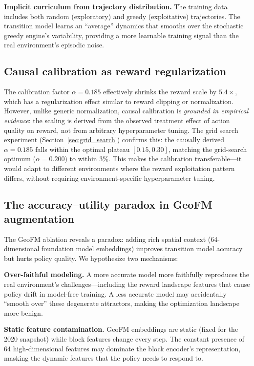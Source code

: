 \documentclass[11pt]{article}
\begin{document}
\textbf{Implicit curriculum from trajectory distribution.} The training data includes both random (exploratory) and greedy (exploitative) trajectories. The transition model learns an ``average'' dynamics that smooths over the stochastic greedy engine's variability, providing a more learnable training signal than the real environment's episodic noise.

\subsection{Causal calibration as reward regularization}

The calibration factor $\alpha = 0.185$ effectively shrinks the reward scale by $5.4\times$, which has a regularization effect similar to reward clipping or normalization. However, unlike generic normalization, causal calibration is \textit{grounded in empirical evidence}: the scaling is derived from the observed treatment effect of action quality on reward, not from arbitrary hyperparameter tuning. The grid search experiment (Section~\ref{sec:grid_search}) confirms this: the causally derived $\alpha = 0.185$ falls within the optimal plateau $[0.15, 0.30]$, matching the grid-search optimum ($\alpha = 0.200$) to within 3\%. This makes the calibration transferable---it would adapt to different environments where the reward exploitation pattern differs, without requiring environment-specific hyperparameter tuning.

\subsection{The accuracy--utility paradox in GeoFM augmentation}

The GeoFM ablation reveals a paradox: adding rich spatial context (64-dimensional foundation model embeddings) improves transition model accuracy but hurts policy quality. We hypothesize two mechanisms:

\textbf{Over-faithful modeling.} A more accurate model more faithfully reproduces the real environment's challenges---including the reward landscape features that cause policy drift in model-free training. A less accurate model may accidentally ``smooth over'' these degenerate attractors, making the optimization landscape more benign.

\textbf{Static feature contamination.} GeoFM embeddings are static (fixed for the 2020 snapshot) while block features change every step. The constant presence of 64 high-dimensional features may dominate the block encoder's representation, masking the dynamic features that the policy needs to respond to.
\end{document}
